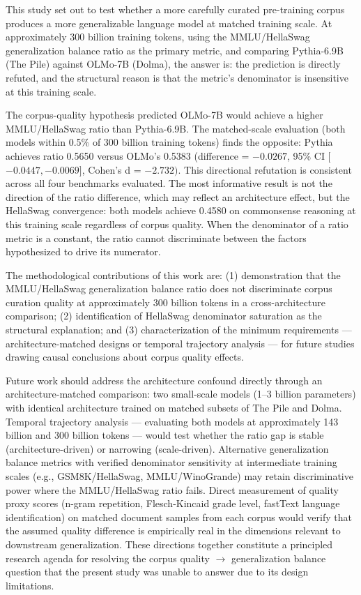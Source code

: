 
This study set out to test whether a more carefully curated pre-training corpus produces a more generalizable language model at matched training scale. At approximately 300 billion training tokens, using the MMLU/HellaSwag generalization balance ratio as the primary metric, and comparing Pythia-6.9B (The Pile) against OLMo-7B (Dolma), the answer is: the prediction is directly refuted, and the structural reason is that the metric's denominator is insensitive at this training scale.

The corpus-quality hypothesis predicted OLMo-7B would achieve a higher MMLU/HellaSwag ratio than Pythia-6.9B. The matched-scale evaluation (both models within 0.5\% of 300 billion training tokens) finds the opposite: Pythia achieves ratio 0.5650 versus OLMo's 0.5383 (difference = $-0.0267$, 95\% CI [$-0.0447, -0.0069]$, Cohen's d = $-2.732)$. This directional refutation is consistent across all four benchmarks evaluated. The most informative result is not the direction of the ratio difference, which may reflect an architecture effect, but the HellaSwag convergence: both models achieve 0.4580 on commonsense reasoning at this training scale regardless of corpus quality. When the denominator of a ratio metric is a constant, the ratio cannot discriminate between the factors hypothesized to drive its numerator.

The methodological contributions of this work are: (1) demonstration that the MMLU/HellaSwag generalization balance ratio does not discriminate corpus curation quality at approximately 300 billion tokens in a cross-architecture comparison; (2) identification of HellaSwag denominator saturation as the structural explanation; and (3) characterization of the minimum requirements --- architecture-matched designs or temporal trajectory analysis --- for future studies drawing causal conclusions about corpus quality effects.

Future work should address the architecture confound directly through an architecture-matched comparison: two small-scale models (1--3 billion parameters) with identical architecture trained on matched subsets of The Pile and Dolma. Temporal trajectory analysis --- evaluating both models at approximately 143 billion and 300 billion tokens --- would test whether the ratio gap is stable (architecture-driven) or narrowing (scale-driven). Alternative generalization balance metrics with verified denominator sensitivity at intermediate training scales (e.g., GSM8K/HellaSwag, MMLU/WinoGrande) may retain discriminative power where the MMLU/HellaSwag ratio fails. Direct measurement of quality proxy scores (n-gram repetition, Flesch-Kincaid grade level, fastText language identification) on matched document samples from each corpus would verify that the assumed quality difference is empirically real in the dimensions relevant to downstream generalization. These directions together constitute a principled research agenda for resolving the corpus quality $\rightarrow$ generalization balance question that the present study was unable to answer due to its design limitations.

